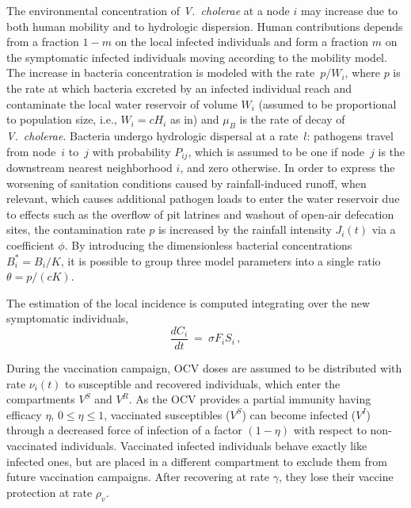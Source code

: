 The environmental concentration of \textit{V.~cholerae} at a node $i$ may increase due to both human mobility and to hydrologic dispersion. Human contributions depends from a fraction $1-m$ on the local infected individuals and form a fraction $m$ on the symptomatic infected individuals moving according to the mobility model. The increase in bacteria concentration is modeled with the rate~$p/W_i$, where $p$ is the rate at which bacteria excreted by an infected individual reach and contaminate the local water reservoir of volume $W_i$ (assumed to be proportional to population size, i.e., $W_i=c H_i$ as in\cite{Rinaldo:Reassessment20102011:2012}) and $\mu_B$ is the rate of decay of \textit{V.~cholerae}. Bacteria undergo hydrologic dispersal at a rate~$l$: pathogens travel from node~$i$ to~$j$ with probability $P_{ij}$, which is assumed to be one if node~$j$ is the downstream nearest neighborhood $i$, and zero otherwise. In order to express the worsening of sanitation conditions caused by rainfall-induced runoff, when relevant, which causes additional pathogen loads to enter the water reservoir due to effects such as the overflow of pit latrines and washout of open-air defecation sites\cite{Gaudart:SpatioTemporalDynamicsCholera:2013}, the contamination rate $p$ is increased by the rainfall intensity $J_i(t)$ via a coefficient $\phi$\cite{Rinaldo:Reassessment20102011:2012,righetto_rainfall_2013}. By introducing the dimensionless bacterial concentrations $B_i^*=B_i/K$,  it is possible to group three model parameters into a single ratio $\theta=p/(cK)$\cite{Bertuzzo:SpacetimeEvolutionCholera:2008}.



The estimation of the local incidence is computed integrating over the new symptomatic individuals,
%
\begin{equation}
\frac{d C_i}{dt} \ = \ \sigma F_i S_i  \, , \label{eq:C}
\end{equation}

During the vaccination campaign, OCV doses are assumed to be distributed with rate $\nu_i(t)$ to susceptible and recovered individuals, which enter the compartments $V^S$ and $V^R$. As the OCV provides a partial immunity having efficacy $\eta$, $0\leq \eta \leq 1$, vaccinated susceptibles ($V^S$) can become infected ($V^I$) through a decreased force of infection of a factor $(1-\eta)$ with respect to non-vaccinated individuals. Vaccinated infected individuals behave exactly like infected ones, but are placed in a different compartment to exclude them from future vaccination campaigns. After recovering at  rate $\gamma$, they lose their vaccine protection at rate $\rho_{v}$.


